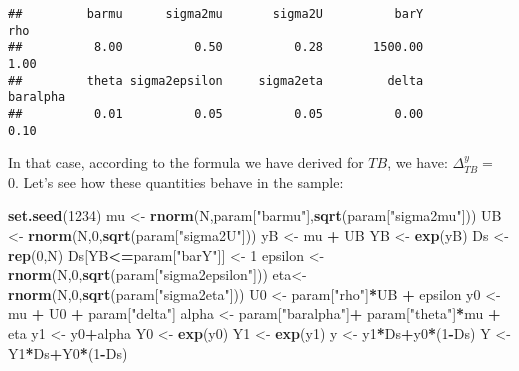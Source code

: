 \documentclass[]{book}
\newenvironment{Shaded}{\begin{snugshade}}{\end{snugshade}}
\newcommand{\KeywordTok}[1]{\textcolor[rgb]{0.13,0.29,0.53}{\textbf{#1}}}
\newcommand{\DecValTok}[1]{\textcolor[rgb]{0.00,0.00,0.81}{#1}}
\newcommand{\StringTok}[1]{\textcolor[rgb]{0.31,0.60,0.02}{#1}}
\newcommand{\OperatorTok}[1]{\textcolor[rgb]{0.81,0.36,0.00}{\textbf{#1}}}
\newcommand{\NormalTok}[1]{#1}
\theoremstyle{definition}
\theoremstyle{definition}
\theoremstyle{definition}
\theoremstyle{remark}
\begin{document}
\begin{verbatim}
##         barmu      sigma2mu       sigma2U          barY           rho 
##          8.00          0.50          0.28       1500.00          1.00 
##         theta sigma2epsilon     sigma2eta         delta      baralpha 
##          0.01          0.05          0.05          0.00          0.10
\end{verbatim}

In that case, according to the formula we have derived for \(TB\), we
have: \(\Delta^y_{TB}=\) 0. Let's see how these quantities behave in the
sample:

\begin{Shaded}
\begin{Highlighting}[]
\KeywordTok{set.seed}\NormalTok{(}\DecValTok{1234}\NormalTok{)}
\NormalTok{mu <-}\StringTok{ }\KeywordTok{rnorm}\NormalTok{(N,param[}\StringTok{"barmu"}\NormalTok{],}\KeywordTok{sqrt}\NormalTok{(param[}\StringTok{"sigma2mu"}\NormalTok{]))}
\NormalTok{UB <-}\StringTok{ }\KeywordTok{rnorm}\NormalTok{(N,}\DecValTok{0}\NormalTok{,}\KeywordTok{sqrt}\NormalTok{(param[}\StringTok{"sigma2U"}\NormalTok{]))}
\NormalTok{yB <-}\StringTok{ }\NormalTok{mu }\OperatorTok{+}\StringTok{ }\NormalTok{UB }
\NormalTok{YB <-}\StringTok{ }\KeywordTok{exp}\NormalTok{(yB)}
\NormalTok{Ds <-}\StringTok{ }\KeywordTok{rep}\NormalTok{(}\DecValTok{0}\NormalTok{,N)}
\NormalTok{Ds[YB}\OperatorTok{<=}\NormalTok{param[}\StringTok{"barY"}\NormalTok{]] <-}\StringTok{ }\DecValTok{1} 
\NormalTok{epsilon <-}\StringTok{ }\KeywordTok{rnorm}\NormalTok{(N,}\DecValTok{0}\NormalTok{,}\KeywordTok{sqrt}\NormalTok{(param[}\StringTok{"sigma2epsilon"}\NormalTok{]))}
\NormalTok{eta<-}\StringTok{ }\KeywordTok{rnorm}\NormalTok{(N,}\DecValTok{0}\NormalTok{,}\KeywordTok{sqrt}\NormalTok{(param[}\StringTok{"sigma2eta"}\NormalTok{]))}
\NormalTok{U0 <-}\StringTok{ }\NormalTok{param[}\StringTok{"rho"}\NormalTok{]}\OperatorTok{*}\NormalTok{UB }\OperatorTok{+}\StringTok{ }\NormalTok{epsilon}
\NormalTok{y0 <-}\StringTok{ }\NormalTok{mu }\OperatorTok{+}\StringTok{  }\NormalTok{U0 }\OperatorTok{+}\StringTok{ }\NormalTok{param[}\StringTok{"delta"}\NormalTok{]}
\NormalTok{alpha <-}\StringTok{ }\NormalTok{param[}\StringTok{"baralpha"}\NormalTok{]}\OperatorTok{+}\StringTok{  }\NormalTok{param[}\StringTok{"theta"}\NormalTok{]}\OperatorTok{*}\NormalTok{mu }\OperatorTok{+}\StringTok{ }\NormalTok{eta}
\NormalTok{y1 <-}\StringTok{ }\NormalTok{y0}\OperatorTok{+}\NormalTok{alpha}
\NormalTok{Y0 <-}\StringTok{ }\KeywordTok{exp}\NormalTok{(y0)}
\NormalTok{Y1 <-}\StringTok{ }\KeywordTok{exp}\NormalTok{(y1)}
\NormalTok{y <-}\StringTok{ }\NormalTok{y1}\OperatorTok{*}\NormalTok{Ds}\OperatorTok{+}\NormalTok{y0}\OperatorTok{*}\NormalTok{(}\DecValTok{1}\OperatorTok{-}\NormalTok{Ds)}
\NormalTok{Y <-}\StringTok{ }\NormalTok{Y1}\OperatorTok{*}\NormalTok{Ds}\OperatorTok{+}\NormalTok{Y0}\OperatorTok{*}\NormalTok{(}\DecValTok{1}\OperatorTok{-}\NormalTok{Ds)}
\end{Highlighting}
\end{Shaded}
\end{document}
